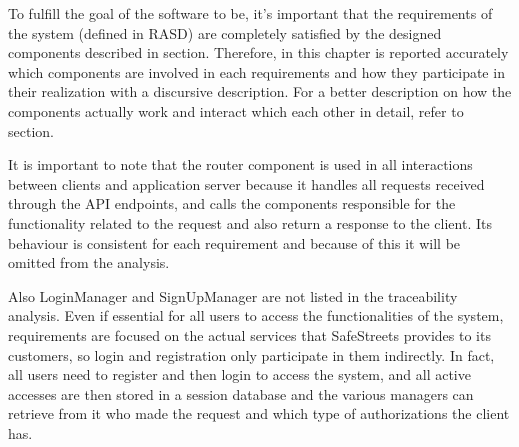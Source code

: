 To fulfill the goal of the software to be, it's important that the requirements of the system (defined in RASD) are completely satisfied by the designed components described in \hyperref[sec:components]{\color{blue}{component view}} section. Therefore, in this chapter is reported accurately which components are involved in each requirements and how they participate in their realization with a discursive description. For a better description on how the components actually work and interact which each other in detail, refer to \hyperref[sec:components]{\color{blue}{component view}} section.

It is important to note that the router component is used in all interactions between clients and application server because it handles all requests received through the API endpoints, and calls the components responsible for the functionality related to the request and also return a response to the client. Its behaviour is consistent for each requirement and because of this it will be omitted from the analysis.

Also LoginManager and SignUpManager are not listed in the traceability analysis. Even if essential for all users to access the functionalities of the system, requirements are focused on the actual services that SafeStreets provides to its customers, so login and registration only participate in them indirectly. In fact, all users need to register and then login to access the system, and all active accesses are then stored in a session database and the various managers can retrieve from it who made the request and which type of authorizations the client has.

